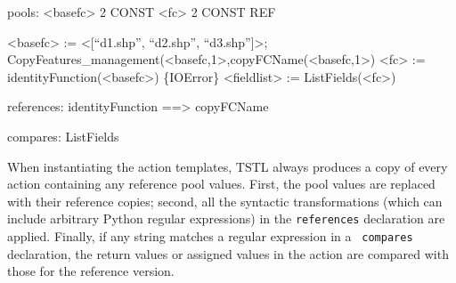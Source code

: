 {\scriptsize
\begin{code}
pools:
  <basefc> 2 CONST
  <fc> 2 CONST REF

<basefc> := <[``d1.shp'', ``d2.shp'', ``d3.shp'']>; \\
  CopyFeatures\_management(<basefc,1>,copyFCName(<basefc,1>)
<fc> := identityFunction(<basefc>)
\{IOError\} <fieldlist> := ListFields(<fc>)

references:
  identityFunction ==> copyFCName

compares:
  ListFields
\end{code}
}

When instantiating the action templates, TSTL always produces a copy
of every action containing any reference pool values.  First, the pool
values are replaced with their reference copies; second, all the
syntactic transformations (which can include arbitrary Python regular
expressions) in the {\tt references} declaration are applied.
Finally, if any string matches a regular expression in a {\tt
  compares} declaration, the return values or assigned values in the
action are compared with those for the reference version.